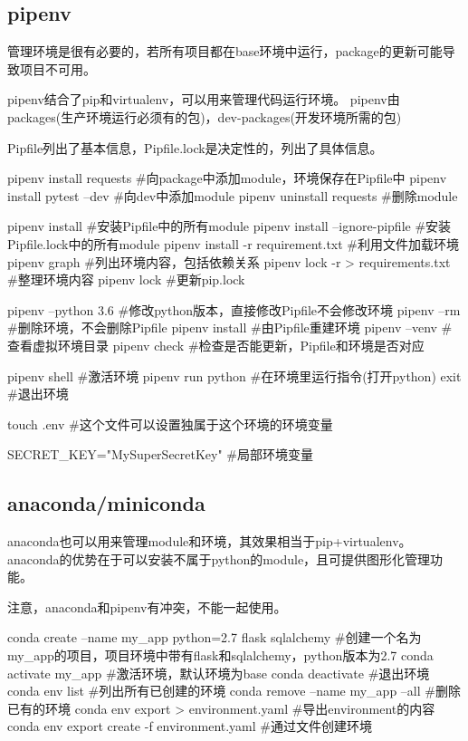   \subsection{pipenv}
    管理环境是很有必要的，若所有项目都在base环境中运行，package的更新可能导致项目不可用。

    pipenv结合了pip和virtualenv，可以用来管理代码运行环境。
    pipenv由packages(生产环境运行必须有的包)，dev-packages(开发环境所需的包)

    Pipfile列出了基本信息，Pipfile.lock是决定性的，列出了具体信息。
    \begin{codeblock}[language=python, caption={pipenv}]
      pipenv install requests #向package中添加module，环境保存在Pipfile中
      pipenv install pytest --dev #向dev中添加module
      pipenv uninstall requests #删除module

      pipenv install #安装Pipfile中的所有module
      pipenv install --ignore-pipfile #安装Pipfile.lock中的所有module
      pipenv install -r requirement.txt #利用文件加载环境
      pipenv graph #列出环境内容，包括依赖关系
      pipenv lock -r > requirements.txt #整理环境内容
      pipenv lock #更新pip.lock

      pipenv --python 3.6 #修改python版本，直接修改Pipfile不会修改环境
      pipenv --rm #删除环境，不会删除Pipfile
      pipenv install #由Pipfile重建环境
      pipenv --venv #查看虚拟环境目录
      pipenv check #检查是否能更新，Pipfile和环境是否对应

      pipenv shell #激活环境
      pipenv run python #在环境里运行指令(打开python)
      exit #退出环境 

      touch .env #这个文件可以设置独属于这个环境的环境变量
    \end{codeblock}

    \begin{codeblock}[language=python, caption={.env}]
      SECRET_KEY="MySuperSecretKey" #局部环境变量
    \end{codeblock}

  \subsection{anaconda/miniconda}
    anaconda也可以用来管理module和环境，其效果相当于pip+virtualenv。
    anaconda的优势在于可以安装不属于python的module，且可提供图形化管理功能。

    注意，anaconda和pipenv有冲突，不能一起使用。
    \begin{codeblock}[language=bash, caption={anaconda}]
      conda create --name my_app python=2.7 flask sqlalchemy
      #创建一个名为my\_app的项目，项目环境中带有flask和sqlalchemy，python版本为2.7
      conda activate my_app #激活环境，默认环境为base
      conda deactivate #退出环境
      conda env list #列出所有已创建的环境 
      conda remove --name my_app --all #删除已有的环境
      conda env export > environment.yaml #导出environment的内容
      conda env export create -f environment.yaml #通过文件创建环境
    \end{codeblock}

